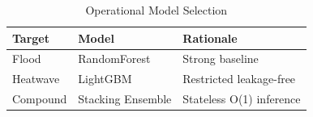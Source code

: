 \begin{table}[htbp]
\centering
\caption{Operational Model Selection}
\label{tab:operational}
\begin{tabular}{@{}lll@{}}
\toprule
\textbf{Target} & \textbf{Model} & \textbf{Rationale} \\
\midrule
Flood & RandomForest & Strong baseline \\
Heatwave & LightGBM & Restricted leakage-free \\
Compound & Stacking Ensemble & Stateless O(1) inference \\
\bottomrule
\end{tabular}
\end{table}